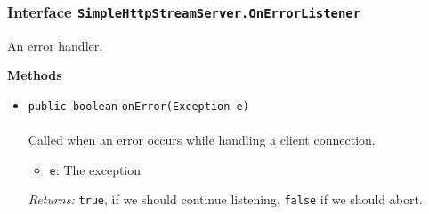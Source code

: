 \subsubsection{Interface \lstinline|SimpleHttpStreamServer.OnErrorListener|}
An error handler. \\
\noindent\begin{minipage}[t]{5cm}
\vspace{0.3em}
\hspace*{2em}
\vspace{0.3em}
\end{minipage}





\textbf{\sffamily Methods}
\begin{itemize}
\item \lstinline|public boolean| \lstinline|onError|\lstinline|(Exception e)|\\ \\[-0.6em]
Called when an error occurs while handling a client connection.
\begin{itemize}
\item \lstinline|e|: The exception
\end{itemize}

\emph{Returns:} \lstinline|true|, if we should continue listening,
 \lstinline|false| if we should abort.

\end{itemize}


